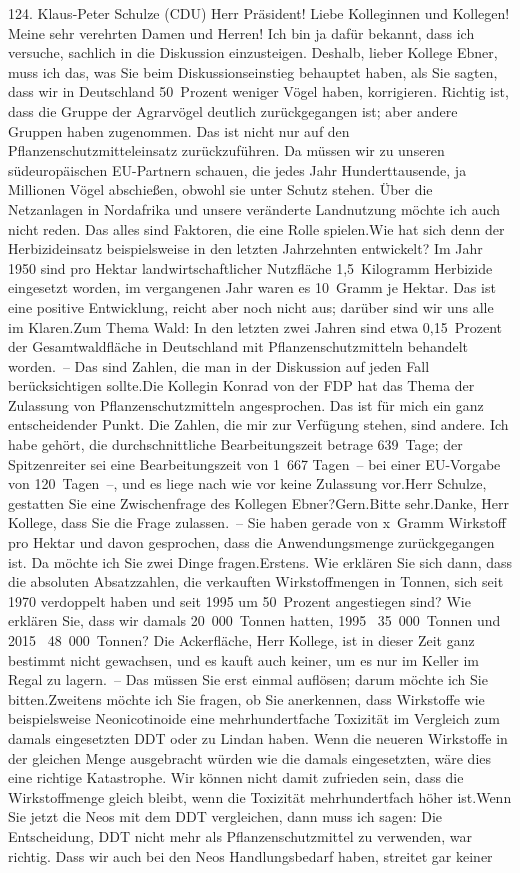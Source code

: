 \documentclass{article}
\begin{document}
	124. Klaus-Peter Schulze (CDU) Herr Präsident! Liebe Kolleginnen und Kollegen! Meine sehr verehrten Damen und Herren! Ich bin ja dafür bekannt, dass ich versuche, sachlich in die Diskussion einzusteigen. Deshalb, lieber Kollege Ebner, muss ich das, was Sie beim Diskussionseinstieg behauptet haben, als Sie sagten, dass wir in Deutschland 50 Prozent weniger Vögel haben, korrigieren. Richtig ist, dass die Gruppe der Agrarvögel deutlich zurückgegangen ist; aber andere Gruppen haben zugenommen. Das ist nicht nur auf den Pflanzenschutzmitteleinsatz zurückzuführen. Da müssen wir zu unseren südeuropäischen EU-Partnern schauen, die jedes Jahr Hunderttausende, ja Millionen Vögel abschießen, obwohl sie unter Schutz stehen. Über die Netzanlagen in Nordafrika und unsere veränderte Landnutzung möchte ich auch nicht reden. Das alles sind Faktoren, die eine Rolle spielen.Wie hat sich denn der Herbizideinsatz beispielsweise in den letzten Jahrzehnten entwickelt? Im Jahr 1950 sind pro Hektar landwirtschaftlicher Nutzfläche 1,5 Kilogramm Herbizide eingesetzt worden, im vergangenen Jahr waren es 10 Gramm je Hektar. Das ist eine positive Entwicklung, reicht aber noch nicht aus; darüber sind wir uns alle im Klaren.Zum Thema Wald: In den letzten zwei Jahren sind etwa 0,15 Prozent der Gesamtwaldfläche in Deutschland mit Pflanzenschutzmitteln behandelt worden. – Das sind Zahlen, die man in der Diskussion auf jeden Fall berücksichtigen sollte.Die Kollegin Konrad von der FDP hat das Thema der Zulassung von Pflanzenschutzmitteln angesprochen. Das ist für mich ein ganz entscheidender Punkt. Die Zahlen, die mir zur Verfügung stehen, sind andere. Ich habe gehört, die durchschnittliche Bearbeitungszeit betrage 639 Tage; der Spitzenreiter sei eine Bearbeitungszeit von 1 667 Tagen – bei einer EU-Vorgabe von 120 Tagen –, und es liege nach wie vor keine Zulassung vor.Herr Schulze, gestatten Sie eine Zwischenfrage des Kollegen Ebner?Gern.Bitte sehr.Danke, Herr Kollege, dass Sie die Frage zulassen. – Sie haben gerade von x Gramm Wirkstoff pro Hektar und davon gesprochen, dass die Anwendungsmenge zurückgegangen ist. Da möchte ich Sie zwei Dinge fragen.Erstens. Wie erklären Sie sich dann, dass die absoluten Absatzzahlen, die verkauften Wirkstoffmengen in Tonnen, sich seit 1970 verdoppelt haben und seit 1995 um 50 Prozent angestiegen sind? Wie erklären Sie, dass wir damals 20 000 Tonnen hatten, 1995  35 000 Tonnen und 2015  48 000 Tonnen? Die Ackerfläche, Herr Kollege, ist in dieser Zeit ganz bestimmt nicht gewachsen, und es kauft auch keiner, um es nur im Keller im Regal zu lagern. – Das müssen Sie erst einmal auflösen; darum möchte ich Sie bitten.Zweitens möchte ich Sie fragen, ob Sie anerkennen, dass Wirkstoffe wie beispielsweise Neonicotinoide eine mehrhundertfache Toxizität im Vergleich zum damals eingesetzten DDT oder zu Lindan haben. Wenn die neueren Wirkstoffe in der gleichen Menge ausgebracht würden wie die damals eingesetzten, wäre dies eine richtige Katastrophe. Wir können nicht damit zufrieden sein, dass die Wirkstoffmenge gleich bleibt, wenn die Toxizität mehrhundertfach höher ist.Wenn Sie jetzt die Neos mit dem DDT vergleichen, dann muss ich sagen: Die Entscheidung, DDT nicht mehr als Pflanzenschutzmittel zu verwenden, war richtig. Dass wir auch bei den Neos Handlungsbedarf haben, streitet gar keiner 
\end{document}
